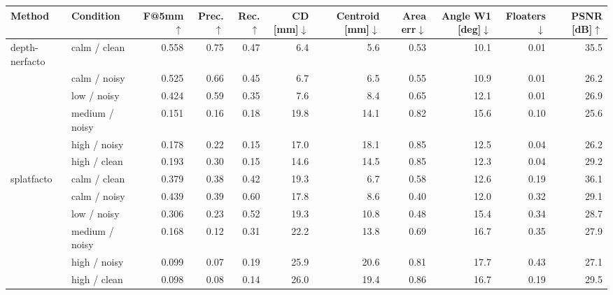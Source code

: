\begin{tabular}{llrrrrrrrrr}
\toprule
Method & Condition & F@5mm$\uparrow$ & Prec.$\uparrow$ & Rec.$\uparrow$ & CD [mm]$\downarrow$ & Centroid [mm]$\downarrow$ & Area err$\downarrow$ & Angle W1 [deg]$\downarrow$ & Floaters$\downarrow$ & PSNR [dB]$\uparrow$ \\
\midrule
depth-nerfacto & calm / clean & 0.558 & 0.75 & 0.47 & 6.4 & 5.6 & 0.53 & 10.1 & 0.01 & 35.5 \\
 & calm / noisy & 0.525 & 0.66 & 0.45 & 6.7 & 6.5 & 0.55 & 10.9 & 0.01 & 26.2 \\
 & low / noisy & 0.424 & 0.59 & 0.35 & 7.6 & 8.4 & 0.65 & 12.1 & 0.01 & 26.9 \\
 & medium / noisy & 0.151 & 0.16 & 0.18 & 19.8 & 14.1 & 0.82 & 15.6 & 0.10 & 25.6 \\
 & high / noisy & 0.178 & 0.22 & 0.15 & 17.0 & 18.1 & 0.85 & 12.5 & 0.04 & 26.2 \\
 & high / clean & 0.193 & 0.30 & 0.15 & 14.6 & 14.5 & 0.85 & 12.3 & 0.04 & 29.2 \\
\midrule
splatfacto & calm / clean & 0.379 & 0.38 & 0.42 & 19.3 & 6.7 & 0.58 & 12.6 & 0.19 & 36.1 \\
 & calm / noisy & 0.439 & 0.39 & 0.60 & 17.8 & 8.6 & 0.40 & 12.0 & 0.32 & 29.1 \\
 & low / noisy & 0.306 & 0.23 & 0.52 & 19.3 & 10.8 & 0.48 & 15.4 & 0.34 & 28.7 \\
 & medium / noisy & 0.168 & 0.12 & 0.31 & 22.2 & 13.8 & 0.69 & 16.7 & 0.35 & 27.9 \\
 & high / noisy & 0.099 & 0.07 & 0.19 & 25.9 & 20.6 & 0.81 & 17.7 & 0.43 & 27.1 \\
 & high / clean & 0.098 & 0.08 & 0.14 & 26.0 & 19.4 & 0.86 & 16.7 & 0.19 & 29.5 \\
\bottomrule
\end{tabular}
